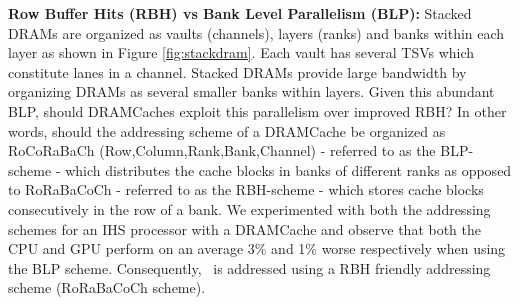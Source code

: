 \par \textbf{Row Buffer Hits (RBH) vs Bank Level Parallelism (BLP):} Stacked DRAMs are organized as vaults (channels), layers (ranks) and banks within each layer as shown in Figure \ref{fig:stackdram}. Each vault has several TSVs which constitute lanes in a channel. Stacked DRAMs provide large bandwidth by organizing DRAMs as several smaller banks within layers. Given this abundant BLP, should DRAMCaches exploit this parallelism over improved RBH? In other words, should the addressing scheme of a DRAMCache be organized as RoCoRaBaCh (Row,Column,Rank,Bank,Channel) - referred to as the BLP-scheme - which distributes the cache blocks in banks of different ranks as opposed to RoRaBaCoCh - referred to as the RBH-scheme - which stores cache blocks consecutively in the row of a bank. We experimented with both the addressing schemes for an IHS processor with a DRAMCache and observe that both the CPU and GPU perform on an average 3\% and 1\% worse respectively when using the BLP scheme. Consequently, \cachename\ is addressed using a RBH friendly addressing scheme (RoRaBaCoCh scheme). 


